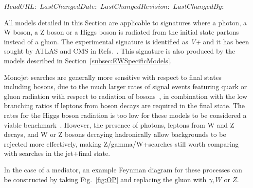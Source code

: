\svnidlong
{$HeadURL: $}
{$LastChangedDate: $}
{$LastChangedRevision: $}
{$LastChangedBy: $}

All models detailed in this Section are applicable to signatures where 
a photon, a W boson, a Z boson or a Higgs boson
is radiated from the initial state partons instead of a gluon. 
The experimental signature is identified as \textit{V+\MET} and it
has been sought by ATLAS and CMS in Refs.~\cite{Khachatryan:2014rwa,Aad:2014tda,Khachatryan:2014tva,ATLAS:2014wra,Aad:2013oja,Aad:2014vka}. 
This signature is also produced by the models described in 
Section~\ref{subsec:EWSpecificModels}. 

Monojet searches are generally more sensitive
with respect to final states including bosons, due to the much
larger rates of signal events featuring quark or gluon radiation with
respect to radiation of bosons~\cite{Zhou:2013fla},
in combination with the low branching ratios if leptons from
boson decays are required in the final state.
The rates for the Higgs boson radiation is too low for these models
to be considered a viable benchmark~\cite{Carpenter:2013xra}.
However, the presence of photons,
leptons from W and Z decays,
and W or Z bosons decaying hadronically
allow backgrounds to be rejected more effectively,
making Z/gamma/W+\MET searches
still worth comparing with searches in the jet+\MET final state.

In the case of a \spinone mediator,
an example Feynman diagram for these processes can be constructed by taking
Fig.~\ref{fig:OP} and replacing the gluon with $\gamma,W$ or $Z$.

